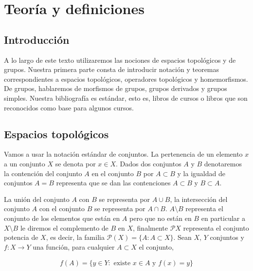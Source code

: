 




	

\tableofcontents

\chapter{Teoría y definiciones}

\section*{Introducción}

A lo largo de este texto utilizaremos las nociones de espacios topológicos y de grupos. Nuestra primera parte consta de introducir notación y teoremas correspondientes a espacios topológicos, operadores topológicos y homemorfismos. De grupos, hablaremos de morfismos de grupos, grupos derivados y grupos simples. Nuestra bibliografía es estándar, esto es, libros de cursos o libros que son reconocidos como base para algunos cursos. 

\section{Espacios topológicos}
 Vamos a usar la notación estándar de conjuntos. La pertenencia de un elemento $x$ a un conjunto $X$ se denota por $x \in X$. Dados dos conjuntos $A$ y $B$ denotaremos la contención del conjunto $A$ en el conjunto $B$ por $A \subset B$ y la igualdad de conjuntos $A=B$ representa que se dan las contenciones $A \subset B$ y $B \subset A$.

La unión del conjunto $A$ con $B$ se representa por $A \cup B$, la intersección del conjunto $A$ con el conjunto $B$ se representa por $A \cap B$. $A \setminus B$ representa el conjunto de los elementos que están en $A$ pero que no están en $B$ en particular a $X\setminus B$ le diremos el complemento de $B$ en $X$,  finalmente $\mathcal{P}X$ representa el conjunto potencia de $X$, es decir, la familia $\mathcal{P}(X)=\{A: A \subset X\}$.  Sean $X$, $Y$ conjuntos y $f:X \to Y$ una función, para cualquier $A \subset X$ el conjunto,
 
 \begin{align*}
 f(A)=\{y \in Y : \text{ existe }x \in A \text{ y } f(x)=y\}
 \end{align*}

